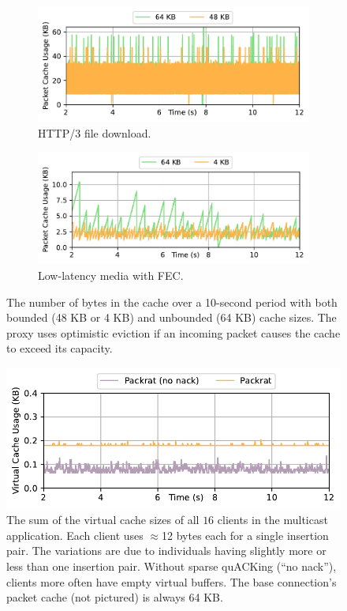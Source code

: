 \begin{figure}[t]
    \centering
    \begin{subfigure}[b]{0.49\linewidth}
        \centering
        \includegraphics[width=\linewidth]{packrat/figures/cache_http.pdf}
        \caption{HTTP/3 file download.
        }
        \label{fig:packrat:memory:http}
    \end{subfigure}
    \begin{subfigure}[b]{0.49\linewidth}
        \centering
        \includegraphics[width=\linewidth]{packrat/figures/cache_media.pdf}
        \caption{Low-latency media with FEC.}
        \label{fig:packrat:memory:media}
    \end{subfigure}
    \caption{The number of bytes in the cache over a
     10-second period with both bounded (48 KB or 4 KB) and unbounded (64 KB)
     cache sizes. The proxy uses optimistic eviction if an incoming packet
     causes the cache to exceed its capacity.}
    \label{fig:packrat:memory}
\end{figure}

\begin{figure}[t]
    \centering
    \includegraphics[width=0.6\linewidth]{packrat/figures/cache_multicast.pdf}
    \caption{The sum of the virtual cache sizes of all $16$ clients in
     the multicast application. Each client uses $\approx\!$12 bytes each for a
     single insertion pair. The variations are due to individuals having
     slightly more or less than one insertion pair. Without sparse quACKing
     (``no nack''), clients more often have empty virtual buffers. The base
     connection's packet cache (not pictured) is always 64 KB.}
    \label{fig:packrat:memory:multicast}
\end{figure}